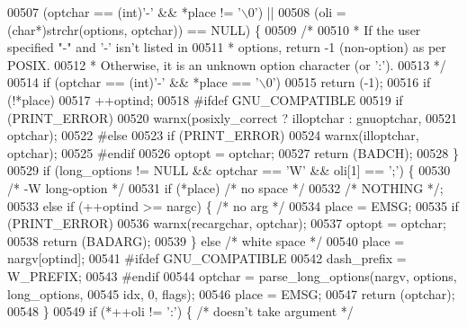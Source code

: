 \begin{DoxyCode}
{{{{{{{{{{{00507         (optchar == (\textcolor{keywordtype}{int})\textcolor{charliteral}{'-'} && *place != \textcolor{charliteral}{'\(\backslash\)0'}) ||
00508         (oli = (\textcolor{keywordtype}{char}*)strchr(options, optchar)) == NULL) \{
00509         \textcolor{comment}{/*}
00510 \textcolor{comment}{         * If the user specified "-" and  '-' isn't listed in}
00511 \textcolor{comment}{         * options, return -1 (non-option) as per POSIX.}
00512 \textcolor{comment}{         * Otherwise, it is an unknown option character (or ':').}
00513 \textcolor{comment}{         */}
00514         \textcolor{keywordflow}{if} (optchar == (\textcolor{keywordtype}{int})\textcolor{charliteral}{'-'} && *place == \textcolor{charliteral}{'\(\backslash\)0'})
00515             \textcolor{keywordflow}{return} (-1);
00516         \textcolor{keywordflow}{if} (!*place)
00517             ++optind;
00518 \textcolor{preprocessor}{#ifdef GNU\_COMPATIBLE}
00519         \textcolor{keywordflow}{if} (PRINT\_ERROR)
00520             warnx(posixly\_correct ? illoptchar : gnuoptchar,
00521                   optchar);
00522 \textcolor{preprocessor}{#else}
00523         \textcolor{keywordflow}{if} (PRINT\_ERROR)
00524             warnx(illoptchar, optchar);
00525 \textcolor{preprocessor}{#endif}
00526         optopt = optchar;
00527         \textcolor{keywordflow}{return} (BADCH);
00528     \}
00529     \textcolor{keywordflow}{if} (long\_options != NULL && optchar == \textcolor{charliteral}{'W'} && oli[1] == \textcolor{charliteral}{';'}) \{
00530         \textcolor{comment}{/* -W long-option */}
00531         \textcolor{keywordflow}{if} (*place)         \textcolor{comment}{/* no space */}
00532             \textcolor{comment}{/* NOTHING */};
00533         \textcolor{keywordflow}{else} \textcolor{keywordflow}{if} (++optind >= nargc) \{   \textcolor{comment}{/* no arg */}
00534             place = EMSG;
00535             \textcolor{keywordflow}{if} (PRINT\_ERROR)
00536                 warnx(recargchar, optchar);
00537             optopt = optchar;
00538             \textcolor{keywordflow}{return} (BADARG);
00539         \} \textcolor{keywordflow}{else}              \textcolor{comment}{/* white space */}
00540             place = nargv[optind];
00541 \textcolor{preprocessor}{#ifdef GNU\_COMPATIBLE}
00542         dash\_prefix = W\_PREFIX;
00543 \textcolor{preprocessor}{#endif}
00544         optchar = parse\_long\_options(nargv, options, long\_options,
00545             idx, 0, flags);
00546         place = EMSG;
00547         \textcolor{keywordflow}{return} (optchar);
00548     \}
00549     \textcolor{keywordflow}{if} (*++oli != \textcolor{charliteral}{':'}) \{            \textcolor{comment}{/* doesn't take argument */}
}}}}}}}}}}}
\end{DoxyCode}
